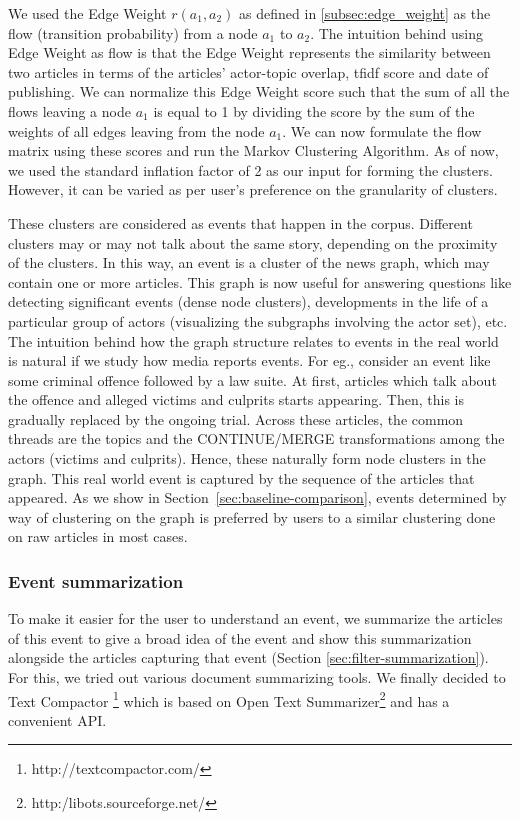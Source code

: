 We used the Edge Weight $r(a_1,a_2)$ as defined in \ref{subsec:edge_weight} as the flow (transition probability) from a node $a_1$ to $a_2$. The intuition behind using Edge Weight as flow is that the Edge Weight represents the similarity between two articles in terms of the articles' actor-topic overlap, tfidf score and date of publishing. We can normalize this Edge Weight score such that the sum of all the flows leaving a node $a_1$ is equal to 1 by dividing the score by the sum of the weights of all edges leaving from the node $a_1$. We can now formulate the flow matrix using these scores and run the Markov Clustering Algorithm. As of now, we used the standard inflation factor of 2 as our input for forming the clusters. However, it can be varied as per user's preference on the granularity of clusters.


These clusters are considered as events that happen in the corpus. Different clusters may or may not talk about the same story, depending on the proximity of the clusters.
In this way, an event is a cluster of the news graph, which may contain one or more articles. 
This graph is now useful for answering questions like detecting significant events (dense node clusters), developments in the life of a particular group of actors (visualizing the subgraphs 
involving the actor set), etc. The intuition behind how the graph structure relates to events in the real world is natural if we study how media reports events. 
For eg., consider an event like some criminal offence followed by a law suite. At first, articles which talk about the offence and alleged victims and culprits starts appearing. Then, this is gradually
replaced by the ongoing trial. Across these articles, the common threads are the topics and the CONTINUE/MERGE transformations among the actors (victims and culprits). Hence, these naturally form node clusters in the graph. This real world event is captured 
by the sequence of the articles that appeared.
As we show in Section~\ref{sec:baseline-comparison}, events determined by way of clustering on the graph is preferred by users to a similar clustering
done on raw articles in most cases.
\subsubsection*{Event summarization}
To make it easier for the user to understand an event, we summarize the articles of this event to give a broad idea of the event and show this summarization alongside the articles capturing that event (Section \ref{sec:filter-summarization}). For this, we tried out various document summarizing tools. We finally decided to Text Compactor \footnote{http://textcompactor.com/} which is based on Open Text Summarizer\footnote{http:/libots.sourceforge.net/} and has a convenient API. 
